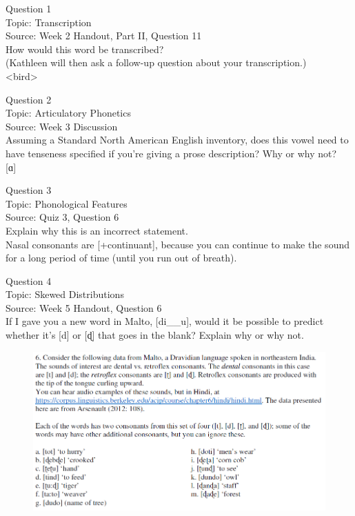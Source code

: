 \documentclass[12pt]{article}
\begin{document}
{\large Question 1}\\

Topic: Transcription\\
Source: Week 2 Handout, Part II, Question 11\\

How would this word be transcribed?\\ (Kathleen will then ask a follow-up question about your transcription.)\\

<bird>


\newpage

{\large Question 2}\\

Topic: Articulatory Phonetics\\
Source: Week 3 Discussion\\

Assuming a Standard North American English inventory, does this vowel need to have tenseness specified if you're giving a prose description? Why or why not?\\

{[ɑ]}


\newpage

{\large Question 3}\\

Topic: Phonological Features\\
Source: Quiz 3, Question 6\\

Explain why this is an incorrect statement.\\

Nasal consonants are {[+continuant]}, because you can continue to make the sound for a long period of time (until you run out of breath).


\newpage

{\large Question 4}\\

Topic: Skewed Distributions\\
Source: Week 5 Handout, Question 6\\

If I gave you a new word in Malto, [di\_\_u], would it be possible to predict whether it's [d] or [ɖ] that goes in the blank? Explain why or why not.\\

\begin{figure}[H]
\includegraphics{../images/malto.png}
\end{figure}
\end{document}
